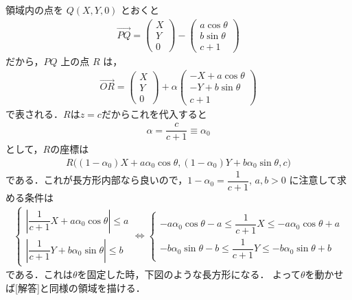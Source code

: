 \documentclass[../../main.tex]{subfiles}
\begin{document}
領域内の点を $Q(X, Y, 0)$ とおくと
\begin{align}
  \overrightarrow{PQ} =
  \begin{pmatrix} X \\ Y \\ 0
  \end{pmatrix} -
  \begin{pmatrix} a\cos\theta \\ b\sin\theta \\ c+1
  \end{pmatrix}
\end{align}
だから，$PQ$ 上の点 $R$ は，
\begin{align}
  \overrightarrow{OR} =
  \begin{pmatrix} X \\ Y \\ 0
  \end{pmatrix} + \alpha
  \begin{pmatrix} -X + a\cos\theta \\ -Y + b\sin\theta \\ c+1
  \end{pmatrix}
\end{align}
で表される．$R$は$z=c$だからこれを代入すると
\begin{align}
  \alpha = \dfrac{c}{c+1} \equiv \alpha_0
\end{align}
として，$R$の座標は
\begin{align}
  R\Big( (1-\alpha_0)X + a \alpha_0 \cos\theta, (1-\alpha_0)Y + b \alpha_0 \sin\theta, c \Big)
\end{align}
である．これが長方形内部なら良いので，$1-\alpha_0 = \dfrac{1}{c+1}$, $a, b > 0$ に注意して求める条件は
\begin{align}
  \begin{cases}
    \left| \dfrac{1}{c+1} X + a \alpha_0 \cos\theta \right| \le a \\[10pt]
    \left| \dfrac{1}{c+1} Y + b \alpha_0 \sin\theta \right| \le b
  \end{cases}
  \iff
  \begin{cases}
    -a \alpha_0 \cos\theta - a \le \dfrac{1}{c+1} X \le -a \alpha_0 \cos\theta + a \\[10pt]
    -b \alpha_0 \sin\theta - b \le \dfrac{1}{c+1} Y \le -b \alpha_0 \sin\theta + b
  \end{cases}
\end{align}
である．これは$\theta$を固定した時，下図のような長方形になる．
よって$\theta$を動かせば[解答]と同様の領域を描ける．
\end{document}
